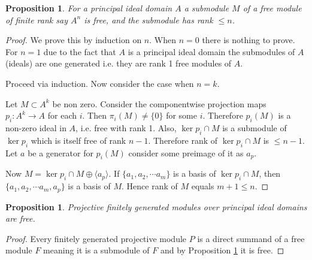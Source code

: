 \documentclass[12pt]{report}
\numberwithin{equation}{section}
\newcounter{dummy} \numberwithin{dummy}{section}
\newtheorem{lemma}[dummy]{Lemma}
\newtheorem{proposition}[dummy]{Proposition}
\begin{document}
	\begin{proposition}\label{submodoffreemodisfreepid}
		For a principal ideal domain $A$ a submodule $M$ of a free module of finite rank say $A^n $ is free, and the submodule has rank $\leq n$.
	\end{proposition}
	\begin{proof}
		We prove this by induction on $n$. When $n=0$ there is nothing to prove. For $n=1$ due to the fact that $A$ is a principal ideal domain the submodules of $A$ (ideals) are one generated i.e. they are rank 1 free modules of $A$.
		
		Proceed via induction. Now consider the case when $n=k$. 
		
		Let $M \subset A^k$ be non zero. Consider the componentwise projection maps $p_i: A^{k} \to A$ for each $i$. Then $\pi_i(M) \neq \{0\}$ for some $i$. Therefore $p_i(M)$ is a non-zero ideal in $A$, i.e. free with rank 1. Also, $\ker p_i \cap M$ is a submodule of $\ker p_i$ which is itself free of rank $n-1$. Therefore rank of $\ker p_i \cap M$ is $\leq n - 1$. Let $a$ be a generator for $p_i(M)$ consider some preimage of it as $a_p$.
		
		Now $M = \ker p_i \cap M \oplus \langle a_p \rangle$. If $\{a_1, a_2, \cdots a_m\}$ is a basis of $\ker p_i \cap M$, then $\{a_1, a_2, \cdots a_m, a_p \}$ is a basis of $M$. Hence rank of $M$ equals $m + 1 \leq n$. 
		
	\end{proof}
	
	\begin{proposition}\label{projfgpidfree}
		Projective finitely generated modules over principal ideal domains are free.
	\end{proposition}
	\begin{proof}
		Every finitely generated projective module $P$ is a direct summand of a free module $F$ meaning it is a submodule of $F$ and by Proposition \ref{submodoffreemodisfreepid} it is free.
	\end{proof}
	
\end{document}
